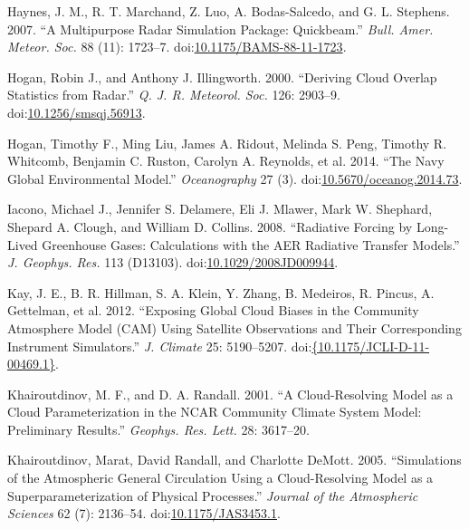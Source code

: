 \hypertarget{ref-haynesux5fetux5falux5f2007}{}
Haynes, J. M., R. T. Marchand, Z. Luo, A. Bodas-Salcedo, and G. L.
Stephens. 2007. ``A Multipurpose Radar Simulation Package: Quickbeam.''
\emph{Bull. Amer. Meteor. Soc.} 88 (11): 1723--7.
doi:\href{https://doi.org/10.1175/BAMS-88-11-1723}{10.1175/BAMS-88-11-1723}.

\hypertarget{ref-hoganux5fandux5fillingworthux5f2000}{}
Hogan, Robin J., and Anthony J. Illingworth. 2000. ``Deriving Cloud
Overlap Statistics from Radar.'' \emph{Q. J. R. Meteorol. Soc.} 126:
2903--9.
doi:\href{https://doi.org/10.1256/smsqj.56913}{10.1256/smsqj.56913}.

\hypertarget{ref-hoganux5fetux5falux5f2014}{}
Hogan, Timothy F., Ming Liu, James A. Ridout, Melinda S. Peng, Timothy
R. Whitcomb, Benjamin C. Ruston, Carolyn A. Reynolds, et al. 2014. ``The
Navy Global Environmental Model.'' \emph{Oceanography} 27 (3).
doi:\href{https://doi.org/10.5670/oceanog.2014.73}{10.5670/oceanog.2014.73}.

\hypertarget{ref-iaconoux5fetux5falux5f2008}{}
Iacono, Michael J., Jennifer S. Delamere, Eli J. Mlawer, Mark W.
Shephard, Shepard A. Clough, and William D. Collins. 2008. ``Radiative
Forcing by Long-Lived Greenhouse Gases: Calculations with the AER
Radiative Transfer Models.'' \emph{J. Geophys. Res.} 113 (D13103).
doi:\href{https://doi.org/10.1029/2008JD009944}{10.1029/2008JD009944}.

\hypertarget{ref-kayux5fetux5falux5f2012}{}
Kay, J. E., B. R. Hillman, S. A. Klein, Y. Zhang, B. Medeiros, R.
Pincus, A. Gettelman, et al. 2012. ``Exposing Global Cloud Biases in the
Community Atmosphere Model (CAM) Using Satellite Observations and Their
Corresponding Instrument Simulators.'' \emph{J. Climate} 25: 5190--5207.
doi:\href{https://doi.org/\%7B10.1175/JCLI-D-11-00469.1\%7D}{\{10.1175/JCLI-D-11-00469.1\}}.

\hypertarget{ref-khairoutdinovux5fandux5frandallux5f2001}{}
Khairoutdinov, M. F., and D. A. Randall. 2001. ``A Cloud-Resolving Model
as a Cloud Parameterization in the NCAR Community Climate System Model:
Preliminary Results.'' \emph{Geophys. Res. Lett.} 28: 3617--20.

\hypertarget{ref-khairoutdinovux5fetux5falux5f2005}{}
Khairoutdinov, Marat, David Randall, and Charlotte DeMott. 2005.
``Simulations of the Atmospheric General Circulation Using a
Cloud-Resolving Model as a Superparameterization of Physical
Processes.'' \emph{Journal of the Atmospheric Sciences} 62 (7):
2136--54.
doi:\href{https://doi.org/10.1175/JAS3453.1}{10.1175/JAS3453.1}.

